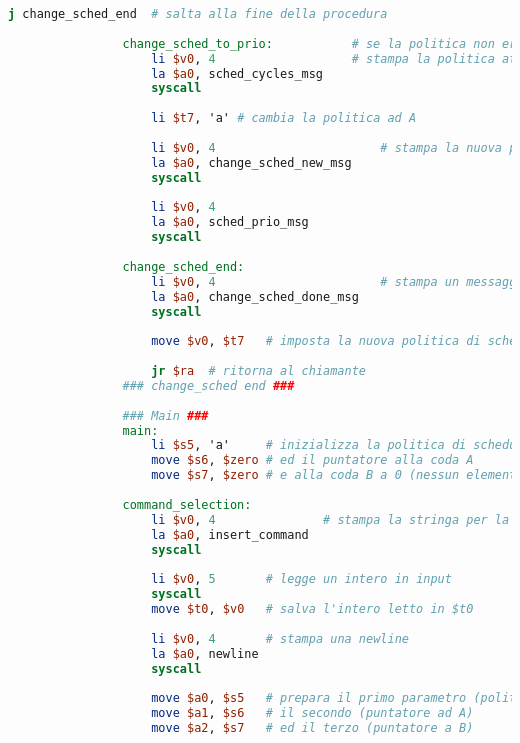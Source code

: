 \begin{center}
\begin{lstlisting}[language=mips, gobble=14, stepnumber=1]
                    j change_sched_end  # salta alla fine della procedura
                    
                change_sched_to_prio:           # se la politica non era A
                    li $v0, 4                   # stampa la politica attuale (su ESECUZIONI RIMANENTI)
                    la $a0, sched_cycles_msg
                    syscall
                
                    li $t7, 'a' # cambia la politica ad A
                    
                    li $v0, 4                       # stampa la nuova politica (su PRIORITA)
                    la $a0, change_sched_new_msg
                    syscall
                    
                    li $v0, 4
                    la $a0, sched_prio_msg
                    syscall
                    
                change_sched_end:
                    li $v0, 4                       # stampa un messaggio di corretta terminazione della procedura
                    la $a0, change_sched_done_msg
                    syscall
                    
                    move $v0, $t7   # imposta la nuova politica di scheduling come valore di ritorno
                    
                    jr $ra  # ritorna al chiamante
                ### change_sched end ###
                
                ### Main ###
                main:
                    li $s5, 'a'     # inizializza la politica di scheduling ad A (scheduling su priorità)
                    move $s6, $zero # ed il puntatore alla coda A
                    move $s7, $zero # e alla coda B a 0 (nessun elemento in coda)
                
                command_selection:
                    li $v0, 4               # stampa la stringa per la selezione del comando
                    la $a0, insert_command
                    syscall
                    
                    li $v0, 5       # legge un intero in input
                    syscall
                    move $t0, $v0   # salva l'intero letto in $t0
                    
                    li $v0, 4       # stampa una newline
                    la $a0, newline
                    syscall
                    
                    move $a0, $s5   # prepara il primo parametro (politica di scheduling)
                    move $a1, $s6   # il secondo (puntatore ad A)
                    move $a2, $s7   # ed il terzo (puntatore a B)
                    

\end{lstlisting}
\end{center}
